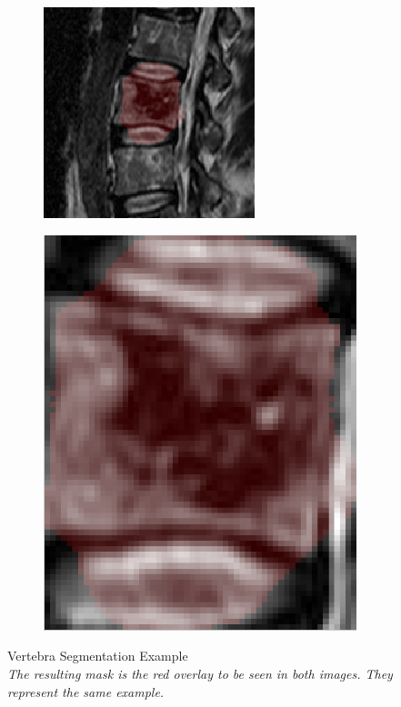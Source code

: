 \documentclass{article}
\begin{document}
{    \begin{figure}[h]
    	\centering
    	\begin{subfigure}[t]{0.45\linewidth}
    		\centering
    		\includegraphics[scale=1.4]{VertebraSegmentationExample_1.png}
    		
    	\end{subfigure}
    	\hfill
    	\begin{subfigure}[t]{0.45\linewidth}
    		\centering
    		\includegraphics[scale=0.4]{VertebraSegmentationExample_2.png}
    	\end{subfigure}
    	\caption{Vertebra Segmentation Example \\ \textit{The resulting mask is the red overlay to be seen in both images. They represent the same example.}}
    \end{figure} 
  }	
  \pagebreak
\end{document}
